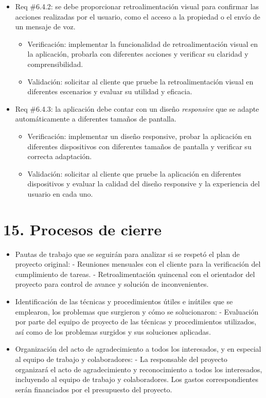 \documentclass[
11pt, %
codirector, %
]{charter}
\begin{document}
\begin{itemize}
    \item Req \#6.4.2: se debe proporcionar retroalimentación visual para confirmar las acciones realizadas por el usuario, como el acceso a la propiedad o el envío de un mensaje de voz.
        \begin{itemize}
            \item Verificación: implementar la funcionalidad de retroalimentación visual en la aplicación, probarla con diferentes acciones y verificar su claridad y comprensibilidad.
            \item Validación: solicitar al cliente que pruebe la retroalimentación visual en diferentes escenarios y evaluar su utilidad y eficacia.
        \end{itemize}

    \item Req \#6.4.3: la aplicación debe contar con un diseño \textit{responsive} que se adapte automáticamente a diferentes tamaños de pantalla.
        \begin{itemize}
            \item Verificación: implementar un diseño responsive, probar la aplicación en diferentes dispositivos con diferentes tamaños de pantalla y verificar su correcta adaptación.
            \item Validación: solicitar al cliente que pruebe la aplicación en diferentes dispositivos y evaluar la calidad del diseño responsive y la experiencia del usuario en cada uno.
        \end{itemize}
    \end{itemize}


\section{15. Procesos de cierre}    
\label{sec:cierre}

\begin{itemize}
    \item Pautas de trabajo que se seguirán para analizar si se respetó el plan de proyecto original:\newline
       - Reuniones mensuales con el cliente para la verificación del cumplimiento de tareas.
       - Retroalimentación quincenal con el orientador del proyecto para control de avance y solución de inconvenientes.

    \item Identificación de las técnicas y procedimientos útiles e inútiles que se emplearon, los problemas que surgieron y cómo se solucionaron:\newline
       - Evaluación por parte del equipo de proyecto de las técnicas y procedimientos utilizados, así como de los problemas surgidos y sus soluciones aplicadas.

    \item Organización del acto de agradecimiento a todos los interesados, y en especial al equipo de trabajo y colaboradores:\newline
       - La responsable del proyecto organizará el acto de agradecimiento y reconocimiento a todos los interesados, incluyendo al equipo de trabajo y colaboradores. Los gastos correspondientes serán financiados por el presupuesto del proyecto.
\end{itemize}
\end{document}
